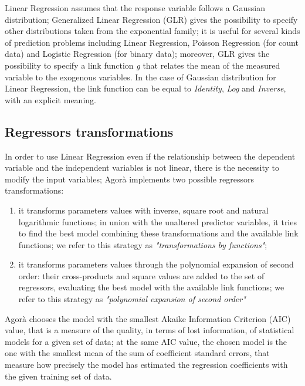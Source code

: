 Linear Regression assumes that the response variable follows a Gaussian distribution; Generalized Linear Regression (GLR) gives the possibility to specify other distributions taken from the exponential family; it is useful for several kinds of prediction problems including Linear Regression, Poisson Regression (for count data) and Logistic Regression (for binary data); moreover, GLR gives the possibility to specify a link function \textit{g} that relates the mean of the measured variable to the exogenous variables. In the case of Gaussian distribution for Linear Regression, the link function can be equal to \textit{Identity}, \textit{Log} and \textit{Inverse}, with an explicit meaning.


\subsection{Regressors transformations}\label{regrTransforms}

In order to use Linear Regression even if the relationship between the dependent variable and the independent variables is not linear, there is the necessity to modify the input variables; Agorà implements two possible regressors transformations:

\begin{enumerate}

    \item it transforms parameters values with inverse, square root and natural logarithmic functions; in union with the unaltered predictor variables, it tries to find the best model combining these transformations and the available link functions; we refer to this strategy as \textit{"transformations by functions"};
    
    \item it transforms parameters values through the polynomial expansion of second order: their cross-products and square values are added to the set of regressors, evaluating the best model with the available link functions; we refer to this strategy as \textit{"polynomial expansion of second order"}

\end{enumerate}

Agorà chooses the model with the smallest Akaike Information Criterion (AIC) value, that is a measure of the quality, in terms of lost information, of statistical models for a given set of data; at the same AIC value, the chosen model is the one with the smallest mean of the sum of coefficient standard errors, that measure how precisely the model has estimated the regression coefficients with the given training set of data.
